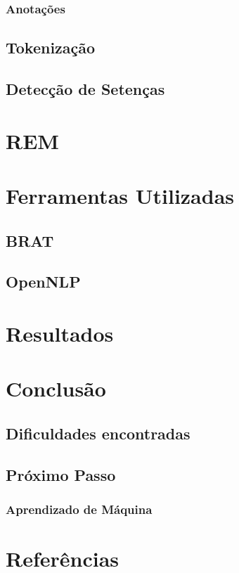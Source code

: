\documentclass[11pt]{report}
\begin{document}
\subsection{Anotações}
\section{Tokenização}
\section{Detecção de Setenças}

\pagebreak
\chapter{REM}

\pagebreak
\chapter{Ferramentas Utilizadas}

\section{BRAT}

\section{OpenNLP}

\pagebreak
\chapter{Resultados}

\pagebreak
\chapter{Conclusão}
\section{Dificuldades encontradas}
\section{Próximo Passo}
\subsection{Aprendizado de Máquina}

\pagebreak
\chapter*{Referências}
\end{document}
